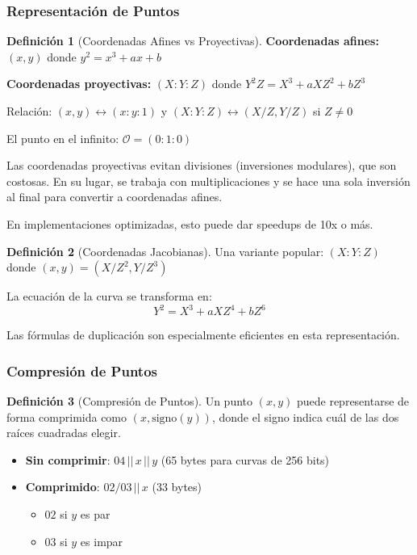 \documentclass[11pt,a4paper,twoside,openright]{book}
\theoremstyle{definition}
\newtheorem{definition}{Definición}[chapter]
\theoremstyle{plain}
\theoremstyle{remark}
\begin{document}
\subsubsection{Representación de Puntos}

\begin{definition}[Coordenadas Afines vs Proyectivas]
\textbf{Coordenadas afines:} $(x, y)$ donde $y^2 = x^3 + ax + b$

\textbf{Coordenadas proyectivas:} $(X : Y : Z)$ donde $Y^2 Z = X^3 + aXZ^2 + bZ^3$

Relación: $(x, y) \leftrightarrow (x : y : 1)$ y $(X : Y : Z) \leftrightarrow (X/Z, Y/Z)$ si $Z \neq 0$

El punto en el infinito: $\mathcal{O} = (0 : 1 : 0)$
\end{definition}

\begin{keyidea}
Las coordenadas proyectivas evitan divisiones (inversiones modulares), que son costosas. En su lugar, se trabaja con multiplicaciones y se hace una sola inversión al final para convertir a coordenadas afines.

En implementaciones optimizadas, esto puede dar speedups de 10x o más.
\end{keyidea}

\begin{definition}[Coordenadas Jacobianas]
Una variante popular: $(X : Y : Z)$ donde $(x, y) = (X/Z^2, Y/Z^3)$

La ecuación de la curva se transforma en:
\[
Y^2 = X^3 + aXZ^4 + bZ^6
\]

Las fórmulas de duplicación son especialmente eficientes en esta representación.
\end{definition}

\subsubsection{Compresión de Puntos}

\begin{definition}[Compresión de Puntos]
Un punto $(x, y)$ puede representarse de forma comprimida como $(x, \text{signo}(y))$, donde el signo indica cuál de las dos raíces cuadradas elegir.

\begin{itemize}
    \item \textbf{Sin comprimir}: $04 \,||\, x \,||\, y$ (65 bytes para curvas de 256 bits)
    \item \textbf{Comprimido}: $02/03 \,||\, x$ (33 bytes)
    \begin{itemize}
        \item $02$ si $y$ es par
        \item $03$ si $y$ es impar
    \end{itemize}
\end{itemize}
\end{definition}
\end{document}
